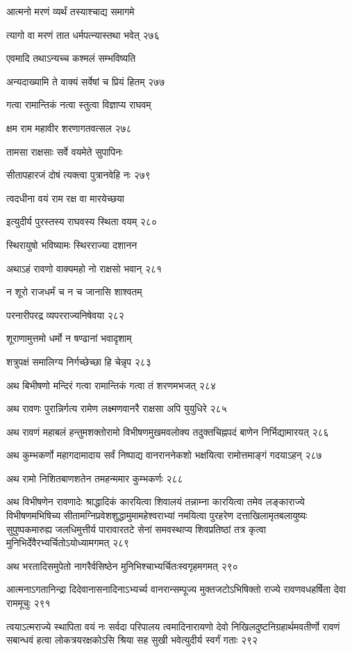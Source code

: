 आत्मनो मरणं व्यर्थं तस्याश्चाद्य समागमे

त्यागो वा मरणं तात धर्मपत्न्यास्तथा भवेत् २७६

एवमादि तथाऽन्यच्च कश्मलं सम्भविष्यति

अन्यदाख्यामि ते वाक्यं सर्वेषां च प्रियं हितम् २७७

गत्वा रामान्तिकं नत्वा स्तुत्वा विज्ञाप्य राघवम्

क्षम राम महावीर शरणागतवत्सल २७८

तामसा राक्षसाः सर्वे वयमेते सुपापिनः

सीतापहारजं दोषं त्यक्त्वा पुत्रानवेहि नः २७९

त्वदधीना वयं राम रक्ष वा मारयेच्छया

इत्युदीर्य पुरस्तस्य राघवस्य स्थिता वयम् २८०

स्थिरायुषो भविष्यामः स्थिरराज्या दशानन

अथाऽहं रावणो वाक्यमहो नो राक्षसो भवान् २८१

न शूरो राजधर्मं च न च जानासि शाश्वतम्

परनारीपरद्र व्यपरराज्यनिषेवया २८२

शूराणामुत्तमो धर्मो न षण्ढानां भवादृशाम्

शत्रुपक्षं समालिग्य निर्गच्छेच्छा हि चेन्नृप २८३

अथ बिभीषणो मन्दिरं गत्वा रामान्तिकं गत्वा तं शरणमभजत् २८४

अथ रावणः पुरान्निर्गत्य रामेण लक्ष्मणवानरै राक्षसा अपि युयुधिरे २८५

अथ रावणं महाबलं हन्तुमशक्तोरामो विभीषणमुखमवलोक्य तदुक्तचिह्नपदं बाणेन निर्भिद्यामारयत्
 २८६

अथ कुम्भकर्णो महागदामादाय सर्वं निष्पाद्य वानराननेकशो भक्षयित्वा रामोत्तमाङ्गं
गदयाऽहन् २८७

अथ रामो निशितबाणशतेन तमहन्ममार कुम्भकर्णः २८८

अथ विभीषणेन रावणादेः श्राद्धादिकं कारयित्वा शिवालयं तन्नाम्ना कारयित्वा तमेव
लङ्काराज्ये विभीषणमभिषिच्य सीतामग्निप्रवेशशुद्धामुमामहेश्वराभ्यां नमयित्वा पुरहरेण
दत्ताखिलामृतबलायुष्यः सुपुष्पकमारुह्य जलधिमुत्तीर्य पारावारतटे सेनां समवस्थाप्य
शिवप्रतिष्ठां तत्र कृत्वा मुनिभिर्देवैरभ्यर्चितोऽयोध्यामगमत् २८९

अथ भरतादिसमुपेतो नागरैर्वसिष्ठेन मुनिभिश्चाभ्यर्चितःस्वगृहमगमत् २९०

आत्मनाऽगतानिन्द्रा दिदेवानासनादिनाऽभ्यर्च्य वानरान्सम्पूज्य मुक्तजटोऽभिषिक्तो राज्ये
रावणवधहर्षिता देवा राममूचुः २९१

त्वयाऽत्मराज्ये स्थापिता वयं नः सर्वदा परिपालय त्वमादिनारायणो देवो
निखिलदुष्टनिग्रहार्थमवतीर्णो रावणं सबान्धवं हत्वा लोकत्रयरक्षकोऽसि श्रिया सह सुखी
भवेत्युदीर्य स्वर्गं गताः २९२

